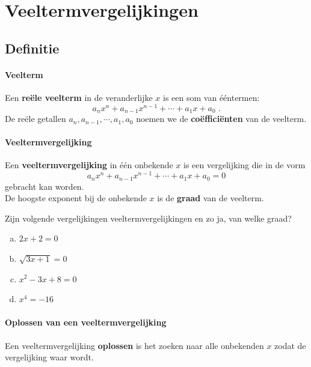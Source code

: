 \documentclass[12pt]{article}
\begin{document}
\onehalfspacing

\section{Veeltermvergelijkingen}

\subsection{Definitie}

\paragraph{Veelterm}
\begin{mdframed}
Een {\bf reële veelterm} in de veranderlijke $x$ is een som van ééntermen:
$$ a_nx^n + a_{n-1}x^{n-1} + \cdots + a_1x + a_0 \;.$$
De reële getallen $a_n, a_{n-1}, \cdots, a_1, a_0$ noemen we de {\bf coëfficiënten} van de veelterm.
\end{mdframed}

\paragraph{Veeltermvergelijking}
\begin{mdframed}
Een {\bf veeltermvergelijking} in één onbekende $x$ is een vergelijking die in de vorm
$$a_nx^n + a_{n-1}x^{n-1} + \cdots + a_1x + a_0 = 0$$
gebracht kan worden.\\
De hoogste exponent bij de onbekende $x$ is de {\bf graad} van de veelterm.
\end{mdframed}

\begin{oefening}
Zijn volgende vergelijkingen veeltermvergelijkingen en zo ja, van welke graad?
\begin{multicols}{2}
\begin{enumerate}[(a)]
  \item $2x + 2 = 0$
  \item $\sqrt{3x+1} = 0$
  \item $x^2-3x+8=0$
  \item $x^4=-16$
\end{enumerate}
\end{multicols}
\end{oefening}

\paragraph{Oplossen van een veeltermvergelijking}
\begin{mdframed}
Een veeltermvergelijking {\bf oplossen} is het zoeken naar alle onbekenden $x$ zodat de vergelijking waar wordt.
\end{mdframed}
\end{document}
